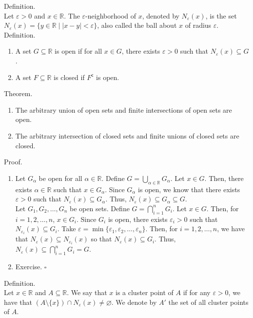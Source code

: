 \documentclass[twocolumn]{article}
\newcommand{\qed}{$\square$}
\newcommand{\br}{\vspace{\baselineskip}}
\newcommand{\COMPLEMENT}{^\mathsf{c}}
\let\complement\COMPLEMENT
\let\emptyset\varnothing
\let\eps\varepsilon
\newcommand{\reals}{\mathbb{R}}
\begin{document}
Definition. \\
Let $\eps > 0$ and $x \in \reals$. The $\eps$-neighborhood of $x$, denoted by $N_\eps(x)$, is the set $N_\eps(x) = \{ y \in \reals \mid |x - y| < \eps \}$, also called the ball about $x$ of radius $\eps$. \\

Definition.
\begin{enumerate}
	\item
		A set $G \subseteq \reals$ is open if for all $x \in G$, there exists $\eps > 0$ such that $N_\eps(x) \subseteq G$.
	\item
		A set $F \subseteq \reals$ is closed if $F\complement$ is open.
\end{enumerate} \br

Theorem.
\begin{enumerate}
	\item
		The arbitrary union of open sets and finite intersections of open sets are open.
	\item
		The arbitrary intersection of closed sets and finite unions of closed sets are closed.
\end{enumerate}
Proof.
\begin{enumerate}
	\item
		Let $G_\alpha$ be open for all $\alpha \in \reals$. Define $G = \bigcup_{\alpha \in \reals} G_\alpha$. Let $x \in G$. Then, there exists $\alpha \in \reals$ such that $x \in G_\alpha$. Since $G_\alpha$ is open, we know that there exists $\eps > 0$ such that $N_\eps(x) \subseteq G_\alpha$. Thus, $N_\eps(x) \subseteq G_\alpha \subseteq G$. \\
		Let $G_1, G_2, \ldots, G_n$ be open sets.  Define $G = \bigcap_{i = 1}^n G_i$. Let $x \in G$. Then, for $i = 1, 2, \ldots, n$, $x \in G_i$. Since $G_i$ is open, there exists $\eps_i > 0$ such that $N_{\eps_i}(x) \subseteq G_i$. Take $\eps = \min \{ \eps_1, \eps_2, \ldots, \eps_n \}$. Then, for $i = 1, 2, \ldots, n$, we have that $N_\eps(x) \subseteq N_{\eps_i}(x)$ so that $N_\eps(x) \subseteq G_i$. Thus, $N_\eps(x) \subseteq \bigcap_{i = 1}^n G_i = G$.
	\item
		Exercise. \qed
\end{enumerate} \br

Definition. \\
Let $x \in \reals$ and $A \subseteq \reals$. We say that $x$ is a cluster point of $A$ if for any $\eps > 0$, we have that $(A \setminus \{ x \}) \cap N_\eps(x) \neq \emptyset$. We denote by $A'$ the set of all cluster points of $A$. \\
\end{document}
